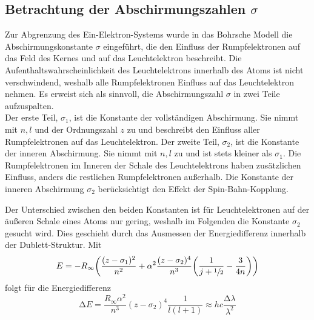 \subsection{Betrachtung der Abschirmungszahlen \texorpdfstring{$\sigma$}{Sigma}}
Zur Abgrenzung des Ein-Elektron-Systems wurde in das Bohrsche Modell die Abschirmungskonstante $\sigma$ eingeführt, die den Einfluss der Rumpfelektronen auf das Feld des Kernes und auf das Leuchtelektron beschreibt.
Die Aufenthaltswahrscheinlichkeit des Leuchtelektrons innerhalb des Atoms ist nicht verschwindend, weshalb alle Rumpfelektronen Einfluss auf das Leuchtelektron nehmen.
Es erweist sich als sinnvoll, die Abschirmungszahl $\sigma$ in zwei Teile aufzuspalten.\\
Der erste Teil, $\sigma_1$, ist die Konstante der vollständigen Abschirmung. 
Sie nimmt mit $n,l$ und der Ordnungszahl $z$ zu und beschreibt den Einfluss aller Rumpfelektronen auf das Leuchtelektron.
Der zweite Teil, $\sigma_2$, ist die Konstante der inneren Abschirmung. 
Sie nimmt mit $n,l$ zu und ist stets kleiner als $\sigma_1$.
Die Rumpfelektronen im Inneren der Schale des Leuchtelektrons haben zusätzlichen Einfluss, anders die restlichen Rumpfelektronen außerhalb.
Die Konstante der inneren Abschirmung $\sigma_2$ berücksichtigt den Effekt der Spin-Bahn-Kopplung.

Der Unterschied zwischen den beiden Konstanten ist für Leuchtelektronen auf der äußeren Schale eines Atoms nur gering, weshalb im Folgenden die Konstante $\sigma_2$ gesucht wird.
Dies geschieht durch das Ausmessen der Energiedifferenz innerhalb der Dublett-Struktur.
Mit
\begin{equation}
	E=-R_\infty\biggl(\frac{(z-\sigma_1)^2}{n^2}+\alpha^2\frac{(z-\sigma_2)^4}{n^3}\biggl(\frac{1}{j+\sfrac{1}{2}}-\frac{3}{4n}\biggr) \biggr)
\end{equation}
folgt für die Energiedifferenz
\begin{equation}
	\mathup{\Delta}E=\frac{R_\infty\alpha^2}{n^3}(z-\sigma_2)^4\frac{1}{l(l+1)}\approx hc\frac{\mathup{\Delta}\lambda}{\lambda^2}
\end{equation}

